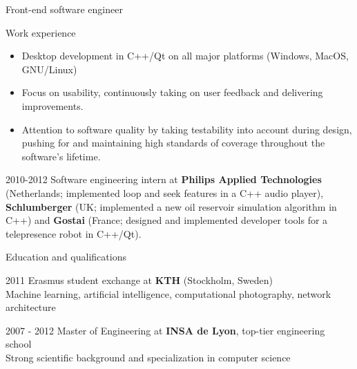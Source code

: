 \documentclass{article}
\begin{document}
\begin{cv}{Front-end software engineer}
\begin{cvlist}{Work experience}
      \begin{itemize}
      \item Desktop development in C++/Qt on all major platforms (Windows, MacOS, GNU/Linux)
      \item Focus on usability, continuously taking on user feedback and
      delivering improvements.

      \item Attention to software quality by taking testability into account during
      design, pushing for and maintaining high standards of coverage throughout
      the software's lifetime.
      \end{itemize}

    \item[2010-2012] Software engineering intern at \textbf{Philips Applied
      Technologies} (Netherlands; implemented loop and seek features in a C++ audio player), \textbf{Schlumberger} (UK; implemented a new oil reservoir simulation algorithm in C++) and
      \textbf{Gostai} (France; designed and implemented developer tools for a telepresence robot in C++/Qt).




\end{cvlist}


\begin{cvlist}{Education and qualifications}
    \item[2011] Erasmus student exchange at \textbf{KTH} (Stockholm, Sweden)\\
    Machine learning, artificial intelligence, computational photography,
      network architecture

    \item[2007 - 2012] Master of Engineering at \textbf{INSA de Lyon}, top-tier
    engineering school\\
    Strong scientific background and specialization in computer science


\end{cvlist}
\end{cv}
\end{document}
